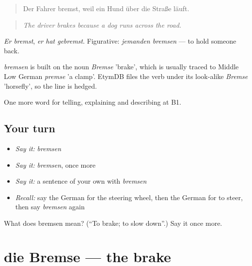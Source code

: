 \begin{quote}
Der Fahrer bremst, weil ein Hund über die Straße läuft.
\end{quote}

\begin{quote}
\emph{The driver brakes because a dog runs across the road.}
\end{quote}

\emph{Er bremst}, \emph{er hat gebremst}. Figurative: \emph{jemanden bremsen} — to hold someone back.

\begin{cousinweb}
\emph{bremsen} is built on the noun \emph{Bremse} 'brake', which is usually traced to Middle Low German \emph{premse} 'a clamp'. EtymDB files the verb under its look-alike \emph{Bremse} 'horsefly', so the line is hedged.
\end{cousinweb}

\begin{grammarlens}[title={What you've built}]
One more word for telling, explaining and describing at B1.
\end{grammarlens}

\subsection*{Your turn}
\begin{itemize}
\raggedright
  \item \emph{Say it:} \emph{bremsen}
  \item \emph{Say it:} \emph{bremsen}, once more
  \item \emph{Say it:} a sentence of your own with \emph{bremsen}
  \item \emph{Recall:} say the German for the steering wheel, then the German for to steer, then say \emph{bremsen} again
\end{itemize}

\begin{tcolorbox}[breakable,colback=teal!4,colframe=teal!35!black,title={Before you move on}]
What does bremsen mean? (\textquotedblleft{}To brake; to slow down\textquotedblright{}.) Say it once more.
\end{tcolorbox}
\section[die Bremse]{die Bremse — the brake}

\label{lesson:GE-C399-bremse}



